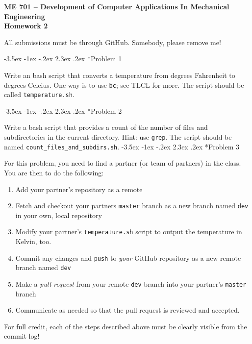 \documentclass[11pt]{article}
\makeatletter
\renewcommand\section{\@startsection{section}{1}{\z@}%
                                  {-3.5ex \@plus -1ex \@minus -.2ex}%
                                  {2.3ex \@plus.2ex}%
                                  {\normalfont\bfseries}}
\makeatother
\begin{document}
{\large
  \begin{center}
    {\bf ME 701 -- Development of Computer Applications In Mechanical Engineering \\ 
         Homework 2 }         
  \end{center}
}
 
All submissions must be through GitHub.
Somebody, please remove me!

\section*{Problem 1}

Write an bash script that converts a temperature from degrees Fahrenheit to degrees Celcius. 
One way is to use {\tt bc}; see TLCL for more.  
The script should be called {\tt temperature.sh}.

\section*{Problem 2}
 
Write a bash script that provides a count of the number of files and subdirectories in the current directory. 
Hint: use {\tt grep}.
The script should be named {\tt count\_files\_and\_subdirs.sh}.
\section*{Problem 3}

For this problem, you need to find a partner (or team of partners) in the class.  
You are then to do the following:
\begin{enumerate}
 \item Add your partner's repository as a remote
 \item Fetch and checkout your partners {\tt master} branch as a new branch named {\tt dev} in your own, local repository
 \item Modify your partner's {\tt  temperature.sh} script to output the temperature in Kelvin, too.
 \item Commit any changes and {\tt push} to {\it your} GitHub repository as a new remote branch named {\tt dev}
 \item Make a {\it pull request} from your remote {\tt dev} branch into your partner's {\tt master} branch
 \item Communicate as needed so that the pull request is reviewed and accepted.
\end{enumerate}
For full credit, each of the steps described above must be clearly visible from the commit log!
\end{document}
